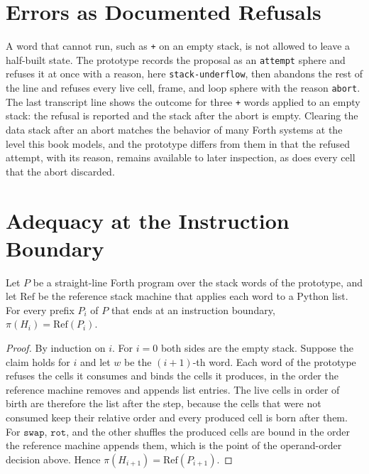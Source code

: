 \section{Errors as Documented Refusals}

A word that cannot run, such as \texttt{+} on an empty stack, is not allowed to leave a half-built state. The prototype records the proposal as an \texttt{attempt} sphere and refuses it at once with a reason, here \texttt{stack-underflow}, then abandons the rest of the line and refuses every live cell, frame, and loop sphere with the reason \texttt{abort}. The last transcript line shows the outcome for three \texttt{+} words applied to an empty stack: the refusal is reported and the stack after the abort is empty. Clearing the data stack after an abort matches the behavior of many Forth systems at the level this book models, and the prototype differs from them in that the refused attempt, with its reason, remains available to later inspection, as does every cell that the abort discarded.

\section{Adequacy at the Instruction Boundary}

\begin{proposition}\label{prop:forth}
Let $P$ be a straight-line Forth program over the stack words of the prototype, and let $\mathrm{Ref}$ be the reference stack machine that applies each word to a Python list. For every prefix $P_i$ of $P$ that ends at an instruction boundary, $\pi(H_i)=\mathrm{Ref}(P_i)$.
\end{proposition}

\begin{proof}
By induction on $i$. For $i=0$ both sides are the empty stack. Suppose the claim holds for $i$ and let $w$ be the $(i+1)$-th word. Each word of the prototype refuses the cells it consumes and binds the cells it produces, in the order the reference machine removes and appends list entries. The live cells in order of birth are therefore the list after the step, because the cells that were not consumed keep their relative order and every produced cell is born after them. For $\mathtt{swap}$, $\mathtt{rot}$, and the other shuffles the produced cells are bound in the order the reference machine appends them, which is the point of the operand-order decision above. Hence $\pi(H_{i+1})=\mathrm{Ref}(P_{i+1})$.
\end{proof}

